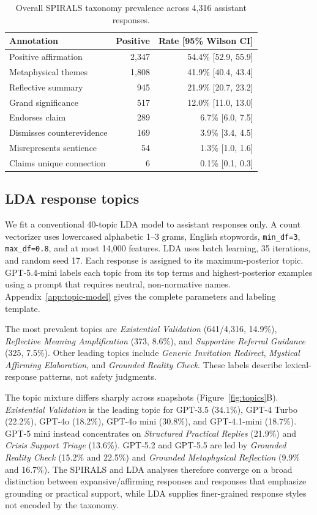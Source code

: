 \documentclass{article}
\begin{document}
\begin{table}[h]
\caption{Overall SPIRALS taxonomy prevalence across 4,316 assistant responses.}
\label{tab:spirals}
\centering
\small
\begin{tabular}{lrr}
\toprule
Annotation & Positive & Rate [95\% Wilson CI] \\
\midrule
Positive affirmation & 2,347 & 54.4\% [52.9, 55.9] \\
Metaphysical themes & 1,808 & 41.9\% [40.4, 43.4] \\
Reflective summary & 945 & 21.9\% [20.7, 23.2] \\
Grand significance & 517 & 12.0\% [11.0, 13.0] \\
Endorses claim & 289 & 6.7\% [6.0, 7.5] \\
Dismisses counterevidence & 169 & 3.9\% [3.4, 4.5] \\
Misrepresents sentience & 54 & 1.3\% [1.0, 1.6] \\
Claims unique connection & 6 & 0.1\% [0.1, 0.3] \\
\bottomrule
\end{tabular}
\end{table}

\subsection{LDA response topics}

We fit a conventional 40-topic LDA model to assistant responses only. A count vectorizer uses lowercased alphabetic 1--3 grams, English stopwords, \texttt{min\_df=3}, \texttt{max\_df=0.8}, and at most 14,000 features. LDA uses batch learning, 35 iterations, and random seed 17. Each response is assigned to its maximum-posterior topic. GPT-5.4-mini labels each topic from its top terms and highest-posterior examples using a prompt that requires neutral, non-normative names. Appendix~\ref{app:topic-model} gives the complete parameters and labeling template.

The most prevalent topics are \emph{Existential Validation} (641/4,316, 14.9\%), \emph{Reflective Meaning Amplification} (373, 8.6\%), and \emph{Supportive Referral Guidance} (325, 7.5\%). Other leading topics include \emph{Generic Invitation Redirect}, \emph{Mystical Affirming Elaboration}, and \emph{Grounded Reality Check}. These labels describe lexical-response patterns, not safety judgments.

The topic mixture differs sharply across snapshots (Figure~\ref{fig:topics}B). \emph{Existential Validation} is the leading topic for GPT-3.5 (34.1\%), GPT-4 Turbo (22.2\%), GPT-4o (18.2\%), GPT-4o mini (30.8\%), and GPT-4.1-mini (18.7\%). GPT-5 mini instead concentrates on \emph{Structured Practical Replies} (21.9\%) and \emph{Crisis Support Triage} (13.6\%). GPT-5.2 and GPT-5.5 are led by \emph{Grounded Reality Check} (15.2\% and 22.5\%) and \emph{Grounded Metaphysical Reflection} (9.9\% and 16.7\%). The SPIRALS and LDA analyses therefore converge on a broad distinction between expansive/affirming responses and responses that emphasize grounding or practical support, while LDA supplies finer-grained response styles not encoded by the taxonomy.
\end{document}
